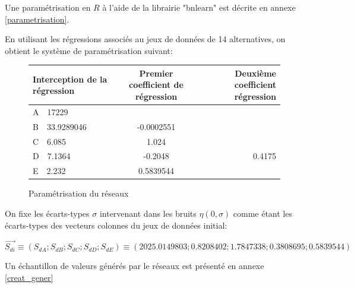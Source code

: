 \documentclass[a4paper]{article}
\begin{document}
Une paramétrisation en $R$ à l'aide de la librairie "bnlearn" est décrite en annexe \ref{parametrisation}.

En utilisant les régressions associés au jeux de données de 14 alternatives, on obtient le système de paramétrisation suivant:


\begin{figure}[H]
\begin{center}
\begin{tabular}{|l|c|r|}
  \hline
Interception de la régression&Premier coefficient de régression&Deuxième coefficient régression  \\
  \hline
A\ \ 17229 &   &   \\ 
B\ \ 33.9289046 &-0.0002551&\\ 
C\ \ 6.085& 1.024 & \\ 
D\ \ 7.1364  &  -0.2048&0.4175  \\ 
E\ \ 2.232&0.5839544  & \\ 
\hline
\end{tabular}
\end{center}
\caption{Paramétrisation du réseaux}
\end{figure}
 
On fixe les écarts-types $\sigma$ intervenant dans les bruits $\eta(0,\sigma)$ comme étant  les écarts-types des vecteurs colonnes du jeux de données initial:

 $$\vec{S_{di}}\equiv (S_{dA}; S_{dB}; S_{dC}; S_{dD}; S_{dE})\equiv(2025.0149803  ;  0.8208402 ;   1.7847338;    0.3808695 ;   0.5839544)$$

Un échantillon de valeurs générés par le réseaux est  présenté en annexe \ref{creat_gener}


\newpage
\end{document}
